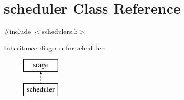 \hypertarget{classscheduler}{
\section{scheduler Class Reference}
\label{classscheduler}
}


{\ttfamily \#include $<$schedulers.h$>$}

Inheritance diagram for scheduler:\begin{figure}[H]
\begin{center}
\leavevmode
\includegraphics[height=2.000000cm]{classscheduler}
\end{center}
\end{figure}
